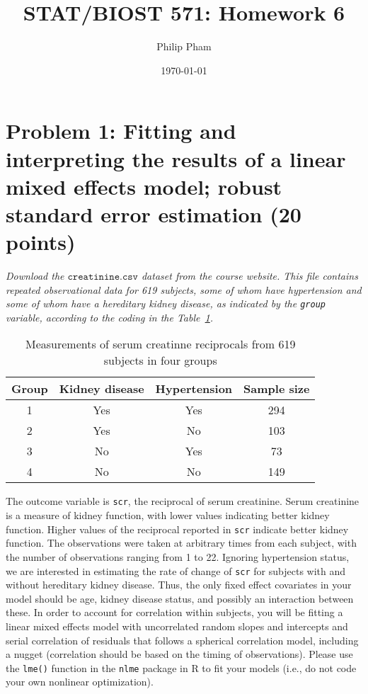 \documentclass[11pt, letterpaper]{article}
\title{STAT/BIOST 571: Homework 6}
\author{Philip Pham}
\date{\today}
\begin{document}
\maketitle

\section*{Problem 1: Fitting and interpreting the results of a linear mixed effects model; robust standard error estimation (20 points)}
 
{\em Download the $\texttt{creatinine.csv}$ dataset from the course website.  This file
contains repeated observational data for 619 subjects, some of whom have hypertension and some
of whom have a hereditary kidney disease, as indicated by the \texttt{group} variable, according to the coding in the Table~\ref{ta:orig.hw1}.
\begin{table}[ht]
\centering
\begin{tabular}{cccc}
\toprule
Group&Kidney disease&Hypertension&Sample size\\
\midrule
1&Yes&Yes&294\\
2&Yes&No&103\\
3&No&Yes&73\\
4&No&No&149\\
\bottomrule
\end{tabular}
\caption{Measurements of serum creatinne reciprocals from 619 subjects in four groups}
\label{ta:orig.hw1}
\end{table}
The outcome variable is \texttt{scr}, the reciprocal of
serum creatinine.  Serum creatinine is a measure of kidney function, with lower values
indicating better kidney function.  Higher values of the reciprocal reported in \texttt{scr} indicate better kidney function.  The observations were taken at arbitrary times from each subject, with the number
of observations ranging from 1 to 22.  Ignoring hypertension status, we are interested in estimating
the rate of change of \texttt{scr} for subjects with and without hereditary kidney disease.
Thus, the only fixed effect covariates in your model should be age, kidney disease status, and possibly an
interaction between these. 
In order to account for correlation within subjects, you will be fitting a linear mixed effects model with
uncorrelated random slopes and intercepts and serial correlation of residuals that follows a spherical
correlation model, including a nugget (correlation should be based on the timing of observations).  Please use the \texttt{lme()} function in the \texttt{nlme} package in R to fit your models (i.e., do not code your own nonlinear optimization).}
\end{document}
